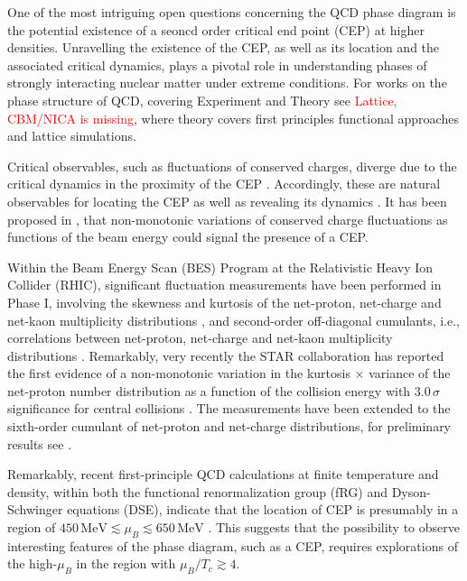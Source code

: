 \documentclass[%
reprint,
superscriptaddress,
showpacs,preprintnumbers,
amsmath,amssymb,
aps,
prd,
]{revtex4-1}
\newcommand{\coljan}[1]{\textcolor{red}{#1}}
\begin{document}
One of the most intriguing open questions concerning the QCD phase diagram is the potential existence of a seoncd order critical end point (CEP) at higher densities. Unravelling the existence of the  CEP, as well as its location and the associated critical dynamics, plays a pivotal role in understanding phases of strongly interacting nuclear matter under extreme conditions. For works on the phase structure of QCD, covering Experiment and Theory see  \cite{Stephanov:2007fk, Friman:2011zz, Luo:2017faz, Dainese:2019xrz, Bzdak:2019pkr, Fischer:2018sdj, Fu:2019hdw} \coljan{Lattice, CBM/NICA is missing}, where theory covers first principles functional approaches and lattice simulations.
	
Critical observables, such as fluctuations of conserved charges, diverge due to the critical dynamics in the proximity of the CEP \cite{Stephanov:2008qz}. Accordingly, these are natural observables for locating the CEP  as well as revealing its dynamics \cite{Luo:2017faz,Adam:2020unf}. It has been proposed in \cite{Stephanov:1999zu, Stephanov:2008qz, Stephanov:2011pb}, that non-monotonic variations of conserved charge fluctuations as functions of the beam energy could signal the presence of a CEP. 
	
Within the Beam Energy Scan (BES) Program at the Relativistic Heavy Ion Collider (RHIC), significant fluctuation measurements have been performed in Phase I, involving the skewness and kurtosis of the net-proton, net-charge and net-kaon multiplicity distributions  \cite{Adamczyk:2013dal,Adamczyk:2014fia,Luo:2015ewa,Adamczyk:2017wsl}, and second-order off-diagonal cumulants, i.e., correlations between net-proton, net-charge and net-kaon multiplicity distributions \cite{Adam:2019xmk}. Remarkably, very recently the STAR collaboration has reported the first evidence of a non-monotonic variation in the kurtosis $\times$ variance of the net-proton number distribution as a function of the collision energy with $3.0\,\sigma$ significance for central collisions \cite{Adam:2020unf}. The measurements have been extended to the sixth-order cumulant of net-proton and net-charge distributions, for preliminary results see  \cite{Nonaka:2020crv,Pandav:2020uzx}.
	
Remarkably, recent first-principle QCD calculations at finite temperature and density, within both the functional renormalization group (fRG) and Dyson-Schwinger equations (DSE), indicate that the location of CEP is presumably in a region of $450\,\mathrm{MeV} \lesssim\mu_B\lesssim 650\,\mathrm{MeV}$ \cite{Fischer:2018sdj,Fu:2019hdw,Isserstedt:2019pgx,Gao:2020qsj, Gao:2020fbl}. This suggests that the possibility to observe interesting features of the phase diagram, such as a CEP, requires explorations of the high-$\mu_B$ in the region with $\mu_B/T_c\gtrsim 4$. 
	
\end{document}
